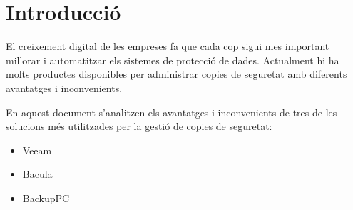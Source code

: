 




\section{Introducció}%
\label{sec:intro}

El creixement digital de les empreses fa que cada cop sigui mes important
millorar i automatitzar els sistemes de protecció de dades. Actualment hi ha
molts productes disponibles per administrar copies de seguretat amb diferents
avantatges i inconvenients.

En aquest document s'analitzen els avantatges i inconvenients de tres de les
solucions més utilitzades per la gestió de copies de seguretat:

\begin{itemize}
    \item Veeam
    \item Bacula
    \item BackupPC
\end{itemize}



